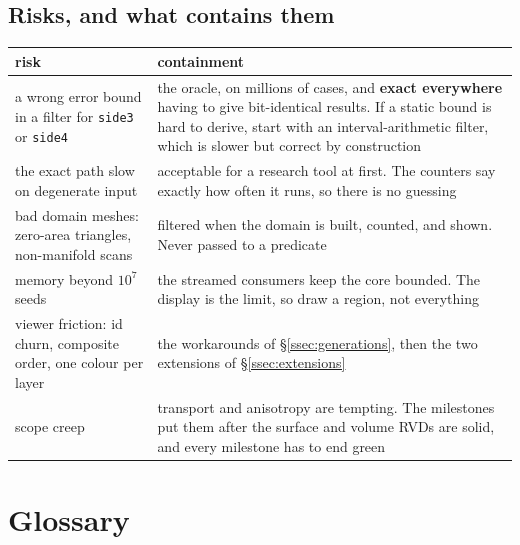 \documentclass[11pt,a4paper]{article}
\newcommand{\code}[1]{\texttt{#1}}          %
\newcommand{\secref}[1]{\S\ref{#1}}
\begin{document}
\subsection{Risks, and what contains them}\label{ssec:risks}

{\small
\begin{xltabular}{\linewidth}{@{}P{4.4cm} L@{}}
\toprule
risk & containment \\
\midrule
\endhead
a wrong error bound in a filter for \code{side3} or \code{side4}
  & the oracle, on millions of cases, and \textbf{exact everywhere} having to give bit-identical
    results. If a static bound is hard to derive, start with an interval-arithmetic filter,
    which is slower but correct by construction \\
the exact path slow on degenerate input
  & acceptable for a research tool at first. The counters say exactly how often it runs, so
    there is no guessing \\
bad domain meshes: zero-area triangles, non-manifold scans
  & filtered when the domain is built, counted, and shown. Never passed to a predicate \\
memory beyond $10^7$ seeds
  & the streamed consumers keep the core bounded. The display is the limit, so draw a region,
    not everything \\
viewer friction: id churn, composite order, one colour per layer
  & the workarounds of \secref{ssec:generations}, then the two extensions of
    \secref{ssec:extensions} \\
scope creep
  & transport and anisotropy are tempting. The milestones put them after the surface and volume
    RVDs are solid, and every milestone has to end green \\
\bottomrule
\end{xltabular}}

\section{Glossary}\label{sec:glossary}
\end{document}
